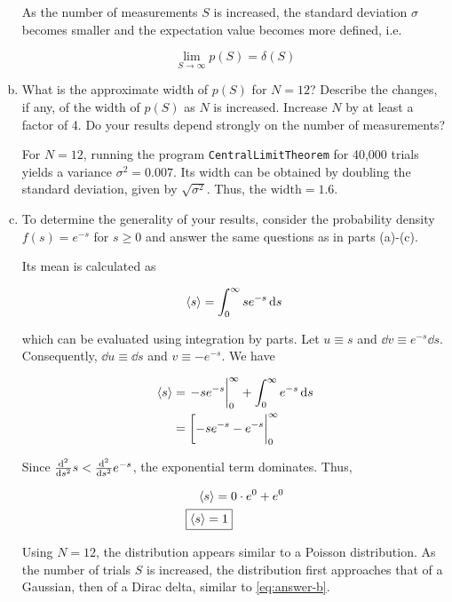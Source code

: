 \documentclass[9pt,a4paper,twocolumn]{article}
\begin{document}
\begin{enumerate}[(a)]
As the number of measurements $S$ is increased, the standard deviation $\sigma$ becomes smaller and the expectation value becomes more defined, i.e.

\begin{equation}\label{eq:answer-b}
	\boxed{
		\lim_{S \rightarrow \infty} p(S) = \delta (S)
	}
\end{equation}

\item What is the approximate width of $p(S)$ for $N = 12$? Describe the changes, if any, of the width of $p(S)$ as $N$ is increased. Increase $N$ by at least a factor of 4. Do your results depend strongly
on the number of measurements?

For $N = 12$, running the program \texttt{CentralLimitTheorem} for 40,000 trials yields a variance $\sigma^2 = 0.007$. Its width can be obtained by doubling the standard deviation, given by $\sqrt{\sigma^2}$. Thus, the $\boxed{\mathrm{width} = 1.6}$.

\item To determine the generality of your results, consider the probability density $f(s) = e^{-s}$ for $s \geq 0$ and answer the same questions as in parts (a)-(c).

Its mean is calculated as 

\begin{equation}
	\ev{s} = \int_0^\infty se^{-s} \dd{s} \\
\end{equation}

which can be evaluated using integration by parts. Let $u \equiv s$ and $\dd{v} \equiv e^{-s} \dd{s}$. Consequently, $\dd{u} \equiv \dd{s}$ and $v \equiv -e^{-s}$. We have

\begin{align}
	\ev{s} &= \eval{-se^{-s}}_0^\infty + \int_0^\infty e^{-s} \dd{s} \\
	&= \eval[-se^{-s} - e^{-s} |_0^\infty \nonumber
\end{align}

Since $\dv[2]{s}s < \dv[2]{s}e^{-s}$, the exponential term dominates. Thus,

\begin{align}
	\ev{s} &= 0\cdot e^0 + e^0 \nonumber \\
	\Aboxed{
		\ev{s} &= 1
	} \label{eq:answer-d-mean}
\end{align}

Using $N = 12$, the distribution appears similar to a Poisson distribution. As the number of trials $S$ is increased, the distribution first approaches that of a Gaussian, then of a Dirac delta, similar to \eqref{eq:answer-b}.


\end{enumerate}
\end{document}
